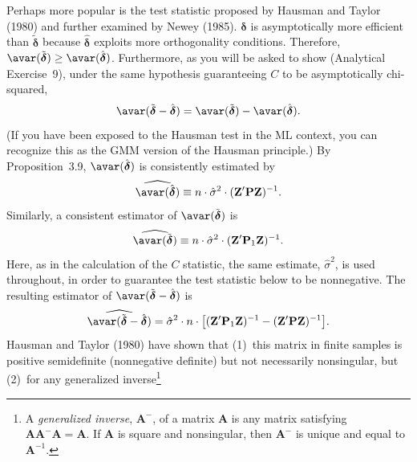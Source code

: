 Perhaps more popular is the test statistic proposed by Hausman and Taylor
(1980) and further examined by Newey (1985).  $\hat{\boldsymbol{\delta}}$ is asymptotically more efficient
than $\tilde{\boldsymbol{\delta}}$ because $\hat{\boldsymbol{\delta}}$ exploits more orthogonality conditions.
Therefore, $\avar(\tilde{\boldsymbol{\delta}}) \geq \avar(\hat{\boldsymbol{\delta}})$.
Furthermore, as you will be asked to show (Analytical Exercise~9), under the same
hypothesis guaranteeing $C$ to be asymptotically chi-squared,
\begin{equation}
  \avar(\tilde{\boldsymbol{\delta}} - \hat{\boldsymbol{\delta}})
  = \avar(\tilde{\boldsymbol{\delta}}) - \avar(\hat{\boldsymbol{\delta}}).
  \label{eq:3.8.18}
\end{equation}
(If you have been exposed to the Hausman test in the ML context, you can recognize
this as the GMM version of the Hausman principle.)  By Proposition~3.9,
$\avar(\hat{\boldsymbol{\delta}})$ is consistently estimated by
\begin{equation}
  \widehat{\avar(\hat{\boldsymbol{\delta}})}
  \equiv n \cdot \hat{\sigma}^2 \cdot (\mathbf{Z}'\mathbf{P}\mathbf{Z})^{-1}.
  \label{eq:3.8.19}
\end{equation}
Similarly, a consistent estimator of $\avar(\tilde{\boldsymbol{\delta}})$ is
\begin{equation}
  \widehat{\avar(\tilde{\boldsymbol{\delta}})}
  \equiv n \cdot \hat{\sigma}^2 \cdot (\mathbf{Z}'\mathbf{P}_1\mathbf{Z})^{-1}.
  \label{eq:3.8.20}
\end{equation}
Here, as in the calculation of the $C$ statistic, the same estimate, $\hat{\sigma}^2$, is used
throughout, in order to guarantee the test statistic below to be nonnegative.  The
resulting estimator of $\avar(\tilde{\boldsymbol{\delta}} - \hat{\boldsymbol{\delta}})$ is
\begin{equation}
  \widehat{\avar(\tilde{\boldsymbol{\delta}} - \hat{\boldsymbol{\delta}})}
  = \hat{\sigma}^2 \cdot n \cdot
    \bigl[(\mathbf{Z}'\mathbf{P}_1\mathbf{Z})^{-1}
    - (\mathbf{Z}'\mathbf{P}\mathbf{Z})^{-1}\bigr].
  \label{eq:3.8.21}
\end{equation}
Hausman and Taylor (1980) have shown that (1)~this matrix in finite samples is
positive semidefinite (nonnegative definite) but not necessarily nonsingular, but
(2)~for any generalized inverse\footnote{A \emph{generalized inverse}, $\mathbf{A}^-$, of a
matrix $\mathbf{A}$ is any matrix satisfying $\mathbf{A}\mathbf{A}^-\mathbf{A} = \mathbf{A}$.  If
$\mathbf{A}$ is square and nonsingular, then $\mathbf{A}^-$ is unique and equal to $\mathbf{A}^{-1}$.}
